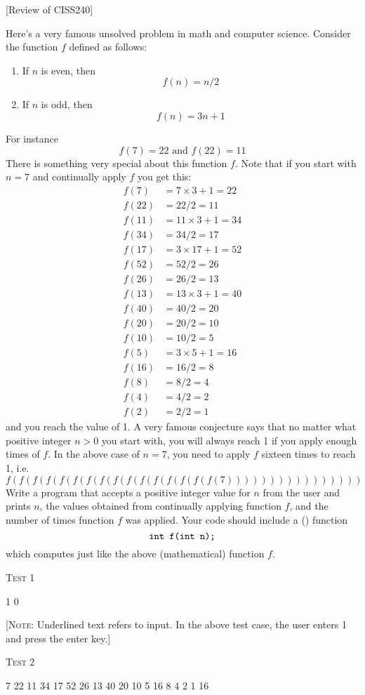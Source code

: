 [Review of CISS240]

Here's a very famous unsolved problem in math and computer science. 
Consider the function $f$
defined as follows:
\begin{enumerate}
\item If $n$ is even, then
\[
f(n) = n/2
\]
\item If $n$ is odd, then
\[
f(n) = 3n + 1
\]
\end{enumerate}
For instance
\[
f(7) = 22 \text{ and } f(22) = 11
\]
There is something very special about this function $f$. 
Note that if you start with $n=7$ and continually
apply $f$ you get this:
\begin{align*}
f(7)  &= 7 \times 3 + 1 = 22 \\
f(22) &= 22/2 = 11 \\
f(11) &= 11 \times 3 + 1 = 34 \\
f(34) &= 34/2 = 17 \\
f(17) &= 3 \times 17 + 1 = 52 \\
f(52) &= 52/2 = 26 \\
f(26) &= 26/2 = 13 \\
f(13) &= 13 \times 3 + 1 = 40 \\
f(40) &= 40/2 = 20 \\
f(20) &= 20/2 = 10 \\
f(10) &= 10/2 = 5 \\
f(5)  &= 3 \times 5 + 1 = 16 \\
f(16) &= 16/2 = 8 \\
f(8)  &= 8/2 = 4 \\
f(4)  &= 4/2 = 2 \\
f(2)  &= 2/2 = 1
\end{align*}
and you reach the value of 1. 
A very famous conjecture says that no matter what positive integer $n > 0$
you start with, you will always reach 1 if you apply enough times of $f$.
In the above case of $n = 7$, 
you need to apply $f$ sixteen times to reach 1, i.e.
\[
f(f(f(f(f(f(f(f(f(f(f(f(f(f(f(f(7))))))))))))))))
\]
Write a program that accepts a positive integer value for $n$ 
from the user and prints $n$, the values
obtained from continually applying function $f$, 
and the number of times function $f$ was applied.
Your code should include a (\cpp) function
\[
\verb!int f(int n);!
\]
which computes just like the above (mathematical) function $f$.


\textsc{Test 1}
\begin{console}[frame=single, fontsize=\footnotesize,commandchars=\\\{\}]
1 0
\end{console}
[\textsc{Note}: Underlined text refers to input. 
In the above test case, the user enters 1 and press the enter key.]

\textsc{Test 2}
\begin{console}[frame=single,fontsize=\footnotesize,commandchars=\\\{\}]
7 22 11 34 17 52 26 13 40 20 10 5 16 8 4 2 1 16
\end{console}


